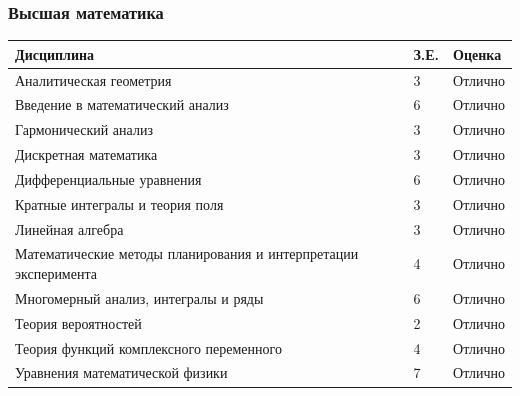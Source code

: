 \documentclass[a4paper,12pt]{article}
\begin{document}
	\subsubsection*{Высшая математика}
	{\fontsize{9}{11}\selectfont
	\begin{tabular}{p{} p{} p{}}
	\toprule
	\textbf{Дисциплина} & \textbf{З.Е.} & \textbf{Оценка} \\
	\midrule
	Аналитическая геометрия & 3 & Отлично \\
	Введение в математический анализ & 6 & Отлично \\
	Гармонический анализ & 3 & Отлично \\
	Дискретная математика & 3 & Отлично \\
	Дифференциальные уравнения & 6 & Отлично \\
	Кратные интегралы и теория поля & 3 & Отлично \\
	Линейная алгебра & 3 & Отлично \\
	Математические методы планирования и интерпретации эксперимента & 4 & Отлично \\
	Многомерный анализ, интегралы и ряды & 6 & Отлично \\
	Теория вероятностей & 2 & Отлично \\
	Теория функций комплексного переменного & 4 & Отлично \\
	Уравнения математической физики & 7 & Отлично \\
	\bottomrule
	\end{tabular}}
	
\end{document}
